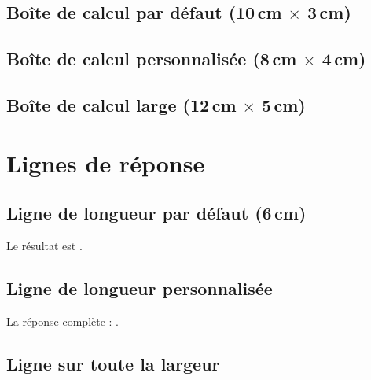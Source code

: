 \documentclass[11pt,a4paper]{article}
\begin{document}
\subsection{Boîte de calcul par défaut (10\,cm $\times$ 3\,cm)}

\begin{center}
\end{center}

\subsection{Boîte de calcul personnalisée (8\,cm $\times$ 4\,cm)}

\begin{center}
\end{center}

\subsection{Boîte de calcul large (12\,cm $\times$ 5\,cm)}

\begin{center}
\end{center}

\section{Lignes de réponse}

\subsection{Ligne de longueur par défaut (6\,cm)}

Le résultat est \reponse.

\subsection{Ligne de longueur personnalisée}

La réponse complète : \reponse[4cm].

\subsection{Ligne sur toute la largeur}
\end{document}
